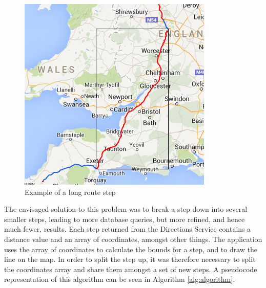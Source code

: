 \documentclass[authoryearcitations]{UoYCSproject}
\begin{document}
\begin{figure}
	\center
	\includegraphics[scale=0.7]{longroutestep}
	\caption{Example of a long route step}
	\label{fig:longroutestep}
\end{figure}

The envisaged solution to this problem was to break a step down into several smaller steps, leading to more database queries, but more refined, and hence much fewer, results. Each step returned from the Directions Service contains a distance value and an array of coordinates, amongst other things. The application uses the array of coordinates to calculate the bounds for a step, and to draw the line on the map. In order to split the step up, it was therefore necessary to split the coordinates array and share them amongst a set of new steps. A pseudocode representation of this algorithm can be seen in Algorithm \autoref{alg:algorithm}.
\end{document}

